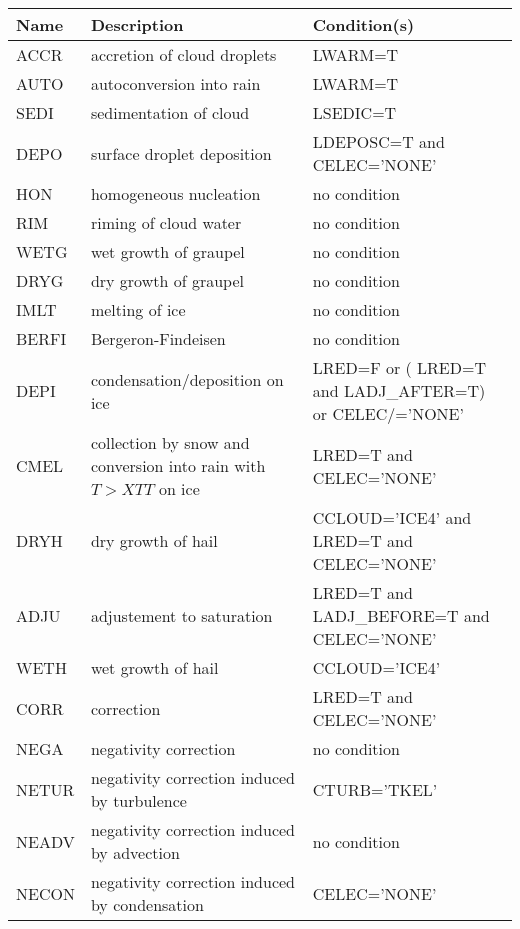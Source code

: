 \begin{longtable} {|p{}|p{}|p{}|}
\hline
Name & Description & Condition(s) \\
\hline \hline
\endhead
ACCR   & accretion of cloud droplets                   & LWARM=T \\\hline
AUTO   & autoconversion into rain                      & LWARM=T \\\hline
SEDI   & sedimentation of cloud                        & LSEDIC=T \\\hline
DEPO   & surface droplet deposition                    & LDEPOSC=T and CELEC='NONE' \\\hline
HON    & homogeneous nucleation                        & no condition \\\hline
RIM    & riming of cloud water                         & no condition \\\hline
WETG   & wet growth of graupel                         & no condition \\\hline
DRYG   & dry growth of graupel                         & no condition \\\hline
IMLT   & melting of ice                                & no condition \\\hline
BERFI  & Bergeron-Findeisen                            & no condition \\\hline
DEPI   & condensation/deposition on ice                & LRED=F or ( LRED=T and LADJ\_AFTER=T) or CELEC/='NONE' \\\hline
CMEL   & collection by snow and conversion into rain with $T>XTT$ on ice & LRED=T and CELEC='NONE' \\\hline
DRYH   & dry growth of hail                            & CCLOUD='ICE4' and LRED=T and CELEC='NONE' \\\hline
ADJU   & adjustement to saturation                     & LRED=T and LADJ\_BEFORE=T and CELEC='NONE' \\\hline
WETH   & wet growth of hail                            & CCLOUD='ICE4' \\\hline
CORR   & correction                                    & LRED=T and CELEC='NONE' \\\hline
NEGA   & negativity correction                         & no condition \\\hline
NETUR  & negativity correction induced by turbulence   & CTURB='TKEL' \\\hline
NEADV  & negativity correction induced by advection    & no condition \\\hline
NECON  & negativity correction induced by condensation & CELEC='NONE' \\\hline
\end{longtable}

